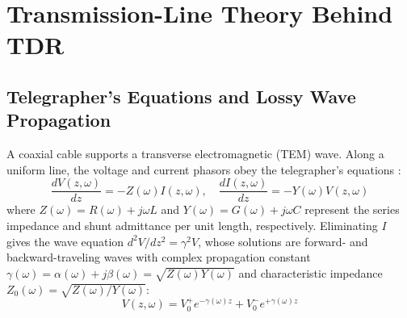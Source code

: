 \section{Transmission-Line Theory Behind TDR}
\label{sec:theory}

\subsection{Telegrapher's Equations and Lossy Wave Propagation}
A coaxial cable supports a transverse electromagnetic (TEM) wave. Along a uniform line, the voltage and current phasors obey the telegrapher's equations \cite{pozar2011microwave}:
\begin{equation}
\frac{d V(z, \omega)}{dz} = -Z(\omega) I(z, \omega), \quad \frac{d I(z, \omega)}{dz} = -Y(\omega) V(z, \omega)
\label{eq:telegrapher}
\end{equation}
where $Z(\omega) = R(\omega) + j\omega L$ and $Y(\omega) = G(\omega) + j\omega C$ represent the series impedance and shunt admittance per unit length, respectively. Eliminating $I$ gives the wave equation $d^2V/dz^2 = \gamma^2 V$, whose solutions are forward- and backward-traveling waves with complex propagation constant $\gamma(\omega) = \alpha(\omega) + j\beta(\omega) = \sqrt{Z(\omega)Y(\omega)}$ and characteristic impedance $Z_0(\omega) = \sqrt{Z(\omega)/Y(\omega)}$:
\begin{equation}
V(z, \omega) = V_0^+ e^{-\gamma(\omega) z} + V_0^- e^{+\gamma(\omega) z}
\label{eq:wave_sol}
\end{equation}

